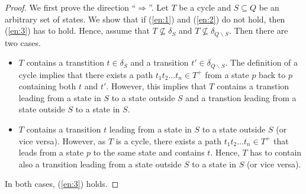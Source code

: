 \documentclass[a4paper,UKenglish,cleveref, autoref, thm-restate]{lipics-v2021}
\begin{document}
\begin{proof}
  We first prove the direction ``$\Longrightarrow$''. Let $T$ be a
  cycle and $S\subseteq Q$ be an arbitrary set of states. We show that
  if (\ref{en:1}) and (\ref{en:2}) do not hold, then (\ref{en:3}) has
  to hold. Hence, assume that $T\not\subseteq\delta_S$ and
  $T\not\subseteq\delta_{Q\smallsetminus S}$. Then there are two
  cases.
  \begin{itemize}
  \item $T$ contains a transtition $t\in\delta_S$ and a transition
    $t'\in\delta_{Q\smallsetminus S}$. The definition of a cycle
    implies that there exists a path $t_1t_2\ldots t_n\in T^+$ from a
    state $p$ back to $p$ containing both $t$ and $t'$. However, this
    implies that $T$ contains a transtion leading from a state in $S$
    to a state outside $S$ and a transtion leading from a state outside $S$
    to a state in $S$.
  \item $T$ contains a transition $t$ leading from a state in $S$ to a
    state outside $S$ (or vice versa). However, as $T$ is a cycle,
    there exists a path $t_1t_2\ldots t_n\in T^+$ that leads from a
    state $p$ to the same state and contains $t$. Hence, $T$ has to
    contain also a transition leading from a state outside $S$ to a
    state in $S$ (or vice versa).
  \end{itemize}
  In both cases, (\ref{en:3}) holds.


\end{proof}
\end{document}
